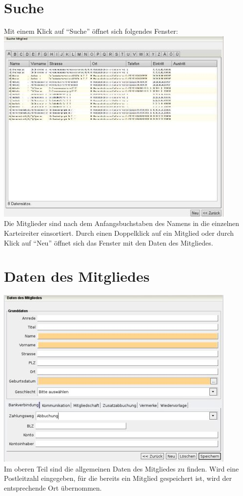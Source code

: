 \documentclass[a4paper,BCOR30mm,DIV14,pdftex,liststotoc,footsepline,openany]{scrbook}
\begin{document}
\section{Suche}
Mit einem Klick auf ``Suche'' öffnet sich folgendes Fenster:\\
\includegraphics{./screenshots/mitgliedsuchen.jpg}\\
Die Mitglieder sind nach dem Anfangsbuchstaben des Namens in die einzelnen Karteireiter einsortiert. Durch einen Doppelklick auf ein Mitglied oder durch Klick auf ``Neu'' öffnet sich das Fenster mit den Daten des Mitgliedes.
\section{Daten des Mitgliedes}
\includegraphics{./screenshots/mitglied.jpg}\\
Im oberen Teil sind die allgemeinen Daten des Mitgliedes zu finden. Wird eine Postleitzahl eingegeben, für die 
bereits ein Mitglied gespeichert ist, wird der entsprechende Ort übernommen. 
\end{document}

